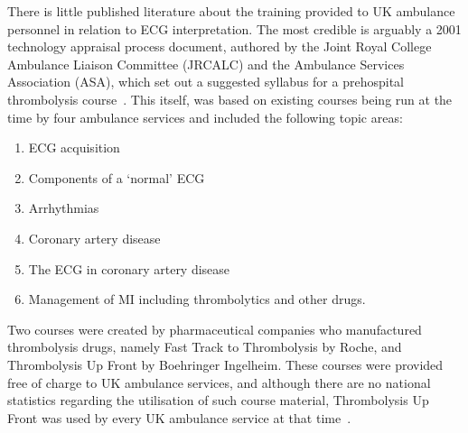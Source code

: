 There is little published literature about the training provided to UK ambulance personnel in relation to ECG interpretation. The most credible is arguably a 2001 technology appraisal process document, authored by the Joint Royal College Ambulance Liaison Committee (JRCALC) and the Ambulance Services Association (ASA), which set out a suggested syllabus for a prehospital thrombolysis course~\citep{the_joint_royal_colleges_ambulance_liaison_committee_pre-hospital_2001}. This itself, was based on existing courses being run at the time by four ambulance services and included the following topic areas:

\begin{enumerate}
\item ECG acquisition

\item Components of a `normal' ECG

\item Arrhythmias

\item Coronary artery disease

\item The ECG in coronary artery disease

\item Management of MI including thrombolytics and other drugs.

\end{enumerate}

Two courses were created by pharmaceutical companies who manufactured thrombolysis drugs, namely Fast Track to Thrombolysis by Roche, and Thrombolysis Up Front by Boehringer Ingelheim. These courses were provided free of charge to UK ambulance services, and although there are no national statistics regarding the utilisation of such course material, Thrombolysis Up Front was used by every UK ambulance service at that time~\citep{watts_thrombolysis_2013}.

